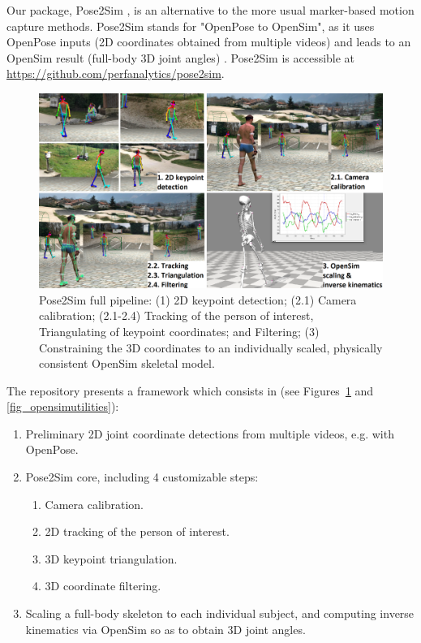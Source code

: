 Our package, Pose2Sim \cite{Pagnon2022b}, is an alternative to the more usual marker-based motion capture methods. Pose2Sim stands for "OpenPose to OpenSim", as it uses OpenPose inputs (2D coordinates obtained from multiple videos) \cite{Cao2019} and leads to an OpenSim result (full-body 3D joint angles) \cite{Delp2007,Seth2018}. Pose2Sim is accessible at \url{https://github.com/perfanalytics/pose2sim}.

\begin{figure}[hbtp]
	\centering
	\def\svgwidth{1\columnwidth}
	\fontsize{10pt}{10pt}\selectfont
	\includegraphics[width=\linewidth]{"../Chap3/Figures/Fig_Pipeline.png"}
	\caption{Pose2Sim full pipeline: (1) 2D keypoint detection; (2.1) Camera calibration; \newline(2.1-2.4) Tracking of the person of interest, Triangulating of keypoint coordinates; and Filtering; (3) Constraining the 3D coordinates to an individually scaled, physically consistent OpenSim skeletal model.}
	\label{fig_pipeline}
\end{figure}

\newpage

The repository presents a framework which consists in (see Figures~\ref{fig_pipeline} and \ref{fig_opensimutilities}):
\begin{enumerate}[itemsep=0em, topsep=0em, leftmargin=*]
      \item Preliminary 2D joint coordinate detections from multiple videos, e.g. with OpenPose.
      \item Pose2Sim core, including 4 customizable steps:
      \begin{enumerate}[before=\vspace{-0.5\baselineskip}, nosep, label*=\arabic*.]
            \item Camera calibration.
            \item 2D tracking of the person of interest.
            \item 3D keypoint triangulation.
            \item 3D coordinate filtering.
      \end{enumerate}
      \item Scaling a full-body skeleton to each individual subject, and computing inverse kinematics via OpenSim so as to obtain 3D joint angles.
\end{enumerate}

